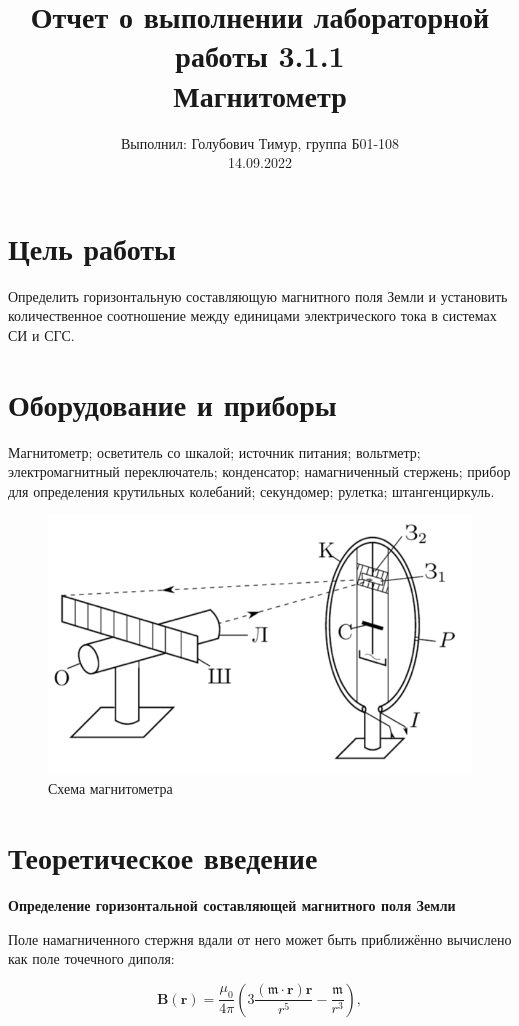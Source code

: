 \documentclass[12pt,a4paper]{article}
\author{\normalsize Выполнил: Голубович Тимур, группа Б01-108 \\
	\normalsize 14.09.2022}
\date{}
\title{
	\large Отчет о выполнении лабораторной работы 3.1.1 \\
	\Large Магнитометр \\ 
	
}
\begin{document}
	\maketitle
	
\section*{Цель работы}
Определить горизонтальную составляющую магнитного поля Земли и установить количественное соотношение между единицами электрического тока в системах СИ и СГС.

\section*{Оборудование и приборы} 
Магнитометр;
осветитель со шкалой;
источник питания;
вольтметр;
электромагнитный переключатель;
конденсатор;
намагниченный стержень;
прибор для определения крутильных колебаний;
секундомер;
рулетка;
штангенциркуль.

\begin{figure}[H]
	\centering
	\includegraphics[width = 8 cm]{res/magnitometer.png}
	\caption{Схема магнитометра}
	\label{fig:scheme}
\end{figure}
	
\newpage
	
\section*{Теоретическое введение}

\textbf{Определение горизонтальной составляющей магнитного поля
Земли}

Поле намагниченного стержня вдали от него может быть приближённо
вычислено как поле точечного диполя:

\begin{equation}
    \textbf{B}\left(\textbf{r}\right)=\frac{\mu_0}{4\pi} \left( 3\frac{\left(\mathfrak{m}\cdot \textbf{r}\right)\textbf{r}}{r^5}-\frac{\mathfrak{m}}{r^3}\right),
    \label{eq:bio}
\end{equation}
\end{document}
